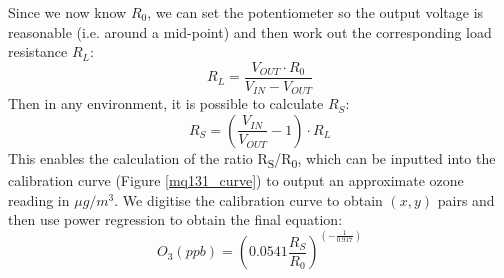 \documentclass[11pt]{report}
\begin{document}
Since we now know $R_0$, we can set the potentiometer so the output voltage is reasonable (i.e. around a mid-point) and then work out the corresponding load resistance $R_L$:
\begin{equation}
R_L = \frac{V_{OUT} \cdot R_0}{V_{IN} - V_{OUT}}
\end{equation}
Then in any environment, it is possible to calculate $R_S$:
\begin{equation}
R_S = (\frac{V_{IN}}{V_{OUT}} - 1) \cdot R_L
\end{equation}
This enables the calculation of the ratio R\textsubscript{S}/R\textsubscript{0}, which can be inputted into the calibration curve (Figure \ref{mq131_curve}) to output an approximate ozone reading in $\mu g/m^3$. We digitise the calibration curve to obtain $(x, y)$ pairs and then use power regression to obtain the final equation:
\begin{equation}
O_3 (ppb) = (0.0541 \frac{R_S}{R_0}) ^ {(-\frac{1}{0.917})}
\end{equation}
\end{document}
